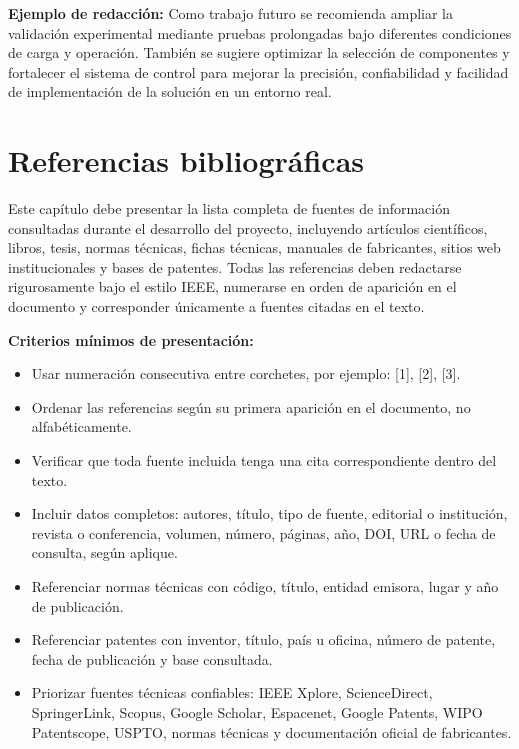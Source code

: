 \documentclass[12pt,letterpaper]{report}
\begin{document}
\begin{instrucciones}
\noindent \textbf{Ejemplo de redacción:} Como trabajo futuro se recomienda ampliar la validación experimental mediante pruebas prolongadas bajo diferentes condiciones de carga y operación. También se sugiere optimizar la selección de componentes y fortalecer el sistema de control para mejorar la precisión, confiabilidad y facilidad de implementación de la solución en un entorno real.
\end{instrucciones}


\chapter{Referencias bibliográficas}

\begin{instrucciones}
Este capítulo debe presentar la lista completa de fuentes de información consultadas durante el desarrollo del proyecto, incluyendo artículos científicos, libros, tesis, normas técnicas, fichas técnicas, manuales de fabricantes, sitios web institucionales y bases de patentes. Todas las referencias deben redactarse rigurosamente bajo el estilo IEEE, numerarse en orden de aparición en el documento y corresponder únicamente a fuentes citadas en el texto.

\vspace{2mm}
\noindent \textbf{Criterios mínimos de presentación:}
\begin{itemize}
  \item Usar numeración consecutiva entre corchetes, por ejemplo: [1], [2], [3].
  \item Ordenar las referencias según su primera aparición en el documento, no alfabéticamente.
  \item Verificar que toda fuente incluida tenga una cita correspondiente dentro del texto.
  \item Incluir datos completos: autores, título, tipo de fuente, editorial o institución, revista o conferencia, volumen, número, páginas, año, DOI, URL o fecha de consulta, según aplique.
  \item Referenciar normas técnicas con código, título, entidad emisora, lugar y año de publicación.
  \item Referenciar patentes con inventor, título, país u oficina, número de patente, fecha de publicación y base consultada.
  \item Priorizar fuentes técnicas confiables: IEEE Xplore, ScienceDirect, SpringerLink, Scopus, Google Scholar, Espacenet, Google Patents, WIPO Patentscope, USPTO, normas técnicas y documentación oficial de fabricantes.
\end{itemize}


\end{instrucciones}
\end{document}
